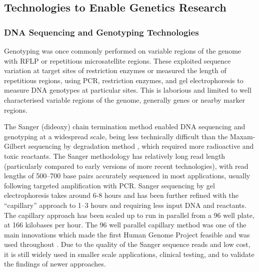 
\subsection{Technologies to Enable Genetics Research}
\subsubsection{DNA Sequencing and Genotyping Technologies}
Genotyping was once commonly performed on variable regions of the genome with \gls{RFLP} or repetitious microsatellite regions. These exploited sequence variation at target sites of restriction enzymes or measured the length of repetitious regions, using \gls{PCR}, restriction enzymes, and gel electrophoresis to measure \gls{DNA} genotypes at particular sites. This is laborious and limited to well characterised variable regions of the genome, generally genes or nearby marker regions. 

The \gls{Sanger} (dideoxy) chain termination method \citep{Sanger1975} enabled DNA sequencing and genotyping at a widespread scale, being less technically difficult than the Maxam-Gilbert sequencing by degradation method \citep{Gilbert1973, Maxam1977}, which required more radioactive and toxic reactants. The \gls{Sanger} methodology has relatively long read length (particularly compared to early versions of more recent technologies), with read lengths of 500--700 base pairs accurately sequenced in most applications, usually following targeted amplification with \gls{PCR}. \gls{Sanger} sequencing by gel electrophoresis takes around 6-8 hours and has been further refined with the ``capillary'' approach to 1--3 hours and requiring less input DNA and reactants. The capillary approach has been scaled up to run in parallel from a 96 well plate, at 166 kilobases per hour. The 96 well parallel capillary method was one of the main innovations which made the first Human Genome Project feasible and was used throughout \citep{Lander2001}. Due to the quality of the \gls{Sanger} sequence reads and low cost, it is still widely used in smaller scale applications, clinical testing, and to validate the findings of newer approaches.


